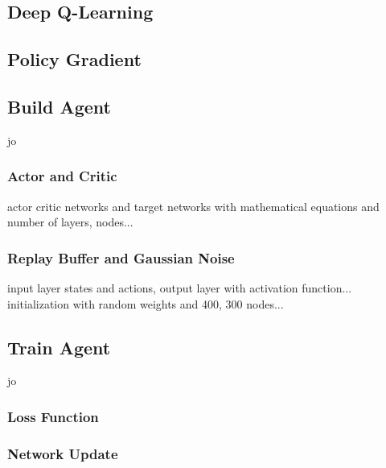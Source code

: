 \subsection{Deep Q-Learning}
\subsection{Policy Gradient}

\subsection{Build Agent}
jo
\subsubsection{Actor and Critic}
actor critic networks and target networks with mathematical equations
and number of layers, nodes... 
\subsubsection{Replay Buffer and Gaussian Noise}
input layer states and actions, output layer with activation function...
initialization with random weights and 400, 300 nodes...
\subsection{Train Agent}
jo
\subsubsection{Loss Function}
\subsubsection{Network Update}
